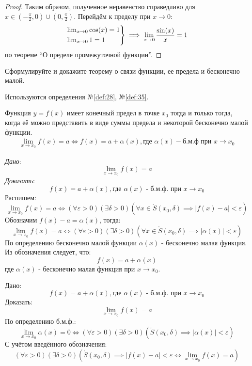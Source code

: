 \begin{proof}
    Таким образом, полученное неравенство справедливо для $x \in \left(-\frac{\pi}{2}, 0\right) \cup \left(0, \frac{\pi}{2}\right)$. Перейдём к пределу при $x \to 0$:
    \begin{gather*}
        \begin{rcases*}
            \lim_{x \to 0} \cos(x) = 1 \\
            \lim_{x \to 0} 1 = 1 
        \end{rcases*} 
        \implies \lim_{x \to 0} \frac{\sin(x)}{x} = 1
    \end{gather*}
    по теореме ``О пределе промежуточной функции''.
\end{proof}
\pagebreak



\begin{question}
    Сформулируйте и докажите теорему о связи функции, ее предела и бесконечно малой.
\end{question}
\begin{used}
    Используются определения №\ref{def:28}, №\ref{def:35}.
\end{used}
\begin{theorem}
    Функция $y = f(x)$ имеет конечный предел в точке  $x_0$ тогда и только тогда, когда её можно представить в виде суммы предела и некоторой бесконечно малой функции.
    \begin{gather*}
        \lim_{x \to x_0} f(x) = a \iff f(x) = a + \alpha(x), \text{где } \alpha(x) - \text{б.м.ф при } x \to x_0
    \end{gather*}
\end{theorem}
\begin{necessity}
    \textit{Дано}: \[
        \lim_{x \to x_0} f(x) = a
    \]
    \textit{Доказать}: \[
        f(x) = a + \alpha(x), \text{где } \alpha(x) \text{ - б.м.ф. при } x \to  x_0
    \]
    Распишем: \[
        \lim_{x \to x_0} f(x) = a \iff (\forall \varepsilon > 0)(\exists \delta > 0)(\forall x \in \mathring{S}(x_0, \delta) \implies |f(x) - a| < \varepsilon)  
    \]
    Обозначим $f(x) - a = \alpha(x)$, тогда: \[
        \lim_{x \to x_0} f(x) = a \iff (\forall \varepsilon > 0)(\exists \delta > 0)(\forall x \in \mathring{S}(x_0, \delta) \implies |\alpha(x)| < \varepsilon)  
    \]
    По определению бесконечно малой функции $\alpha(x)$ - бесконечно малая функция. Из обозначения следует, что: \[
        f(x) = a + \alpha(x)
    \]
    где $\alpha(x)$ - бесконечно малая функция при $x \to x_0$.
\end{necessity}
\begin{sufficiency}
    Дано: \[
        f(x) = a + \alpha(x), \text{где } \alpha(x) \text{ - б.м.ф. при } x \to x_0
    \]
    Доказать: \[
        \lim_{x \to x_0} f(x) = a
    \]
    По определению б.м.ф.: \[
        \lim_{x \to x_0} \alpha(x) = 0 \iff (\forall \varepsilon > 0)(\exists \delta > 0)(\mathring{S}(x_0, \delta) \implies |\alpha(x)| < \varepsilon)
    \]
    С учётом введённого обозначения: \[
        (\forall \varepsilon > 0)(\exists \delta > 0)(\mathring{S}(x_0, \delta) \implies |f(x) - a| < \varepsilon \iff \lim_{x \to x_0} f(x) = a)
    \]
\end{sufficiency}
\pagebreak


